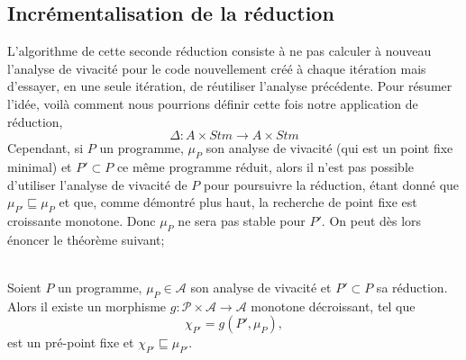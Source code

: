 \documentclass[a4paper, 12pt]{article}
\begin{document}
\subsection{Incrémentalisation de la réduction}
L'algorithme de cette seconde réduction consiste à ne pas calculer à nouveau l'analyse de vivacité pour le
code nouvellement créé à chaque itération mais d'essayer, en une seule itération, de réutiliser l'analyse précédente.
Pour résumer l'idée, voilà comment nous pourrions définir cette fois notre application de réduction,
\[\Delta : A \times Stm \longrightarrow A \times Stm \]
Cependant, si $P$ un programme, $\mu_P$ son analyse de vivacité (qui est un point fixe minimal) et $P' \subset P$ ce même programme
réduit, alors il n'est pas possible d'utiliser l'analyse de vivacité de $P$ pour poursuivre la réduction, étant donné que
$\mu_{P'} \sqsubseteq \mu_P$ et que, comme démontré plus haut, la recherche de point fixe est croissante monotone. Donc
$\mu_P$ ne sera pas stable pour $P'$. On peut dès lors énoncer le théorème suivant;
\\
\\
\begin{theorem}
	Soient $P$ un programme, $\mu_P \in \mathcal{A}$ son analyse de vivacité et $P' \subset P$ sa réduction. Alors il existe un morphisme
	$g : \mathcal{P} \times \mathcal{A} \longrightarrow \mathcal{A}$ monotone décroissant, tel que 
	\[\chi_{P'} = g(P', \mu_P),\]
	est un pré-point fixe et $\chi_{P'} \sqsubseteq \mu_{P'}$.
\end{theorem}
\\
\\
\end{document}
